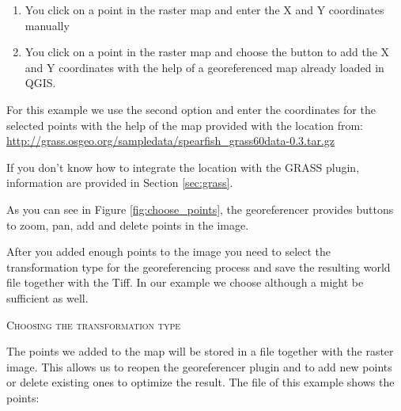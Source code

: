 \begin{enumerate}
\item You click on a point in the raster map and enter the X and Y coordinates manually
\item You click on a point in the raster map and choose the button  to add the X and Y coordinates with the help of a georeferenced map already loaded in QGIS.
\end{enumerate}


For this example we use the second option and enter the coordinates for the selected points with the help of the  map provided with the   location from: \url{http://grass.osgeo.org/sampledata/spearfish\_grass60data-0.3.tar.gz}

If you don't know how to integrate the  location with the GRASS plugin, information are provided in Section \ref{sec:grass}.

As you can see in Figure \ref{fig:choose_points}, the georeferencer provides buttons to zoom, pan, add and delete points in the image.

After you added enough points to the image you need to select the transformation type for the georeferencing process and save the resulting world file together with the Tiff.
In our example we choose 
although a 
might be sufficient as well.


\begin{Tip}\caption{\textsc{Choosing the transformation type}}
\end{Tip} 

The points we added to the map will be stored in a  file together with the raster image.
This allows us to reopen the georeferencer plugin and to add new points or delete existing ones to optimize the result.
The  file of this example shows the points:

